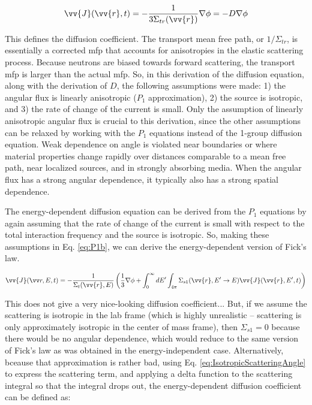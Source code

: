 \begin{equation}
\label{eq:P1b_CurrentApproximation_2}
\vv{J}(\vv{r},t) =  - \frac{1}{3\Sigma_{tr}(\vv{r})}\nabla\phi = -D\nabla\phi
\end{equation}

This defines the diffusion coefficient. The transport mean free path, or \(1/\Sigma_{tr}\), is essentially a corrected mfp that accounts for anisotropies in the elastic scattering process.  Because neutrons are biased towards forward scattering, the transport mfp is larger than the actual mfp. So, in this derivation of the diffusion equation, along with the derivation of \(D\), the following assumptions were made: 1) the angular flux is linearly anisotropic (\(P_1\) approximation), 2) the source is isotropic, and 3) the rate of change of the current is small. Only the assumption of linearly anisotropic angular flux is crucial to this derivation, since the other assumptions can be relaxed by working with the \(P_1\) equations instead of the 1-group diffusion equation. Weak dependence on angle is violated near boundaries or where material properties change rapidly over distances comparable to a mean free path, near localized sources, and in strongly absorbing media. When the angular flux has a strong angular dependence, it typically also has a strong spatial dependence. 

The energy-dependent diffusion equation can be derived from the \(P_1\) equations by again assuming that the rate of change of the current is small with respect to the total interaction frequency and the source is isotropic. So, making these assumptions in Eq. \ref{eq:P1b}, we can derive the energy-dependent version of Fick's law. 

\begin{equation}
\label{eq:P1b_energyDepdendent}
\vv{J}\spas = - \frac{1}{\Sigma_t(\vv{r},E)}\left(\frac{1}{3}\nabla\phi + \int_{0}^{\infty}dE' \int_{4\pi}^{ } \Sigma_{s1}(\vv{r}, E'\rightarrow E)\vv{J}(\vv{r}, E', t)\right)
\end{equation}

This does not give a very nice-looking diffusion coefficient... But, if we assume the scattering is isotropic in the lab frame (which is highly unrealistic – scattering is only approximately isotropic in the center of mass frame), then \(\Sigma_{s1}=0\) because there would be no angular dependence, which would reduce to the same version of Fick’s law as was obtained in the energy-independent case. Alternatively, bceause that approximation is rather bad, using Eq. \ref{eq:IsotropicScatteringAngle} to express the scattering term, and applying a delta function to the scattering integral so that the integral drops out, the energy-dependent diffusion coefficient can be defined as:

